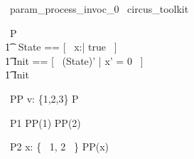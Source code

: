 
\begin{zsection}
  \SECTION\ param\_process\_invoc\_0 \parents\ circus\_toolkit
\end{zsection}

\begin{circus}
    \circprocess\ P \circdef  \circbegin  \\
    	\t1 \circstate\ State == [~ x:\nat | true ~] \\
    	\t1	Init == [~ (State)' | x' = 0 ~] \\
        \t1 \circspot \lschexpract Init \rschexpract \circseq \Skip \\
    \circend
\end{circus}

\begin{circus}
    \circprocess\ PP \circdef  v: \{1,2,3\} \circspot P \\
\end{circus}

\begin{circus}
    \circprocess\ P1 \circdef PP(1) \interleave PP(2) \\
\end{circus}

\begin{circus}
    \circprocess\ P2 \circdef \Interleave x: \{~ 1, 2 ~\} \circspot PP(x) \\
\end{circus}
